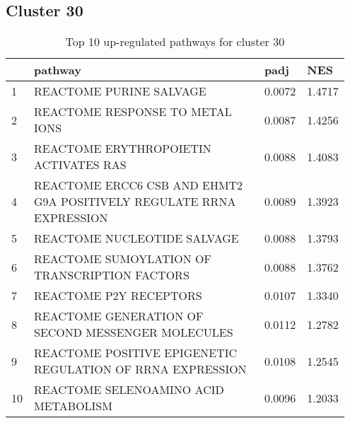\documentclass{article}
\begin{document}
\subsection{Cluster 30 }
\begin{table}[H]
\centering
\begin{tabular}{p{0.05\linewidth}p{0.7\linewidth}p{0.1\linewidth}p{0.1\linewidth}}
  \hline
 & pathway & padj & NES \\ 
  \hline
1 & REACTOME PURINE SALVAGE & 0.0072 & 1.4717 \\ 
  2 & REACTOME RESPONSE TO METAL IONS & 0.0087 & 1.4256 \\ 
  3 & REACTOME ERYTHROPOIETIN ACTIVATES RAS & 0.0088 & 1.4083 \\ 
  4 & REACTOME ERCC6 CSB AND EHMT2 G9A POSITIVELY REGULATE RRNA EXPRESSION & 0.0089 & 1.3923 \\ 
  5 & REACTOME NUCLEOTIDE SALVAGE & 0.0088 & 1.3793 \\ 
  6 & REACTOME SUMOYLATION OF TRANSCRIPTION FACTORS & 0.0088 & 1.3762 \\ 
  7 & REACTOME P2Y RECEPTORS & 0.0107 & 1.3340 \\ 
  8 & REACTOME GENERATION OF SECOND MESSENGER MOLECULES & 0.0112 & 1.2782 \\ 
  9 & REACTOME POSITIVE EPIGENETIC REGULATION OF RRNA EXPRESSION & 0.0108 & 1.2545 \\ 
  10 & REACTOME SELENOAMINO ACID METABOLISM & 0.0096 & 1.2033 \\ 
   \hline
\end{tabular}
\caption{Top 10 up-regulated pathways for cluster 30} 
\label{tab:q3_2_30}
\end{table}
\end{document}
